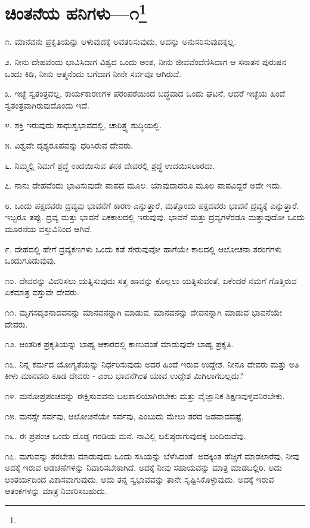 \newpage

\chapter[ಚಿಂತನೆಯ ಹನಿಗಳು—೧]{ಚಿಂತನೆಯ ಹನಿಗಳು—೧\protect\footnote{}}

೧. ಮಾನವನು ಪ್ರಕೃತಿಯನ್ನು ಆಳುವುದಕ್ಕೆ ಅವತರಿಸುವುದು, ಅದನ್ನು ಅನುಸರಿಸುವುದಕ್ಕಲ್ಲ.

೨. ನೀನು ದೇಹವೆಂದು ಭಾವಿಸಿದಾಗ ವಿಶ್ವದ ಒಂದು ಅಂಶ, ನೀನು ಜೀವವೆಂದೆಣಿಸಿದಾಗ ಆ ಸನಾತನ ಪುರುಷನ ಒಂದು ಕಿಡಿ, ನೀನು ಆತ್ಮನೆಂದು ಬಗೆದಾಗ ನೀನೇ ಸರ್ವವೂ ಆಗಿರುವೆ.

೩. ಇಚ್ಛೆ ಸ್ವತಂತ್ರವಲ್ಲ, ಕಾರ್ಯಕಾರಣಗಳ ಪರಂಪರೆಯಿಂದ ಬದ್ಧವಾದ ಒಂದು ಘಟನೆ. ಆದರೆ ಇಚ್ಛೆಯ ಹಿಂದೆ ಸ್ವತಂತ್ರವಾಗಿರುವುದೊಂದು ಇದೆ.

೪. ಶಕ್ತಿ ಇರುವುದು ಸಾಧುಸ್ವಭಾವದಲ್ಲಿ, ಚಾರಿತ್ರ್ಯ ಶುದ್ಧಿಯಲ್ಲಿ.

೫. ವಿಶ್ವವೇ ದೃಶ್ಯರೂಪವನ್ನು ಧರಿಸಿರುವ ದೇವರು.

೬. ನಿಮ್ಮಲ್ಲಿ ನಿಮಗೆ ಶ್ರದ್ಧೆ ಉದಯಿಸುವ ತನಕ ದೇವರಲ್ಲಿ ಶ್ರದ್ಧೆ ಉದಯಿಸಲಾರದು.

೭. ನಾನು ದೇಹವೆಂದು ಭಾವಿಸುವುದೇ ಪಾಪದ ಮೂಲ. ಯಾವುದಾದರೂ ಮೂಲ ಪಾಪವಿದ್ದರೆ ಅದೇ ಇದು.

೮. ಒಂದು ಪಕ್ಷದವರು ದ್ರವ್ಯವು  ಭಾವನೆಗೆ  ಕಾರಣ ಎನ್ನುತ್ತಾರೆ, ಮತ್ತೊಂದು ಪಕ್ಷದವರು ಭಾವನೆ ದ್ರವ್ಯಕ್ಕೆ ಎನ್ನುತ್ತಾರೆ. ಇಬ್ಬರೂ ತಪ್ಪು. ದ್ರವ್ಯ ಮತ್ತು ಭಾವನೆ ಏಕಕಾಲದಲ್ಲಿ ಇರುವುವು, ಭಾವನೆ ಮತ್ತು ದ್ರವ್ಯಗಳೆರಡೂ ಮತ್ತಾವುದೋ ಒಂದು ಮೂರನೆಯ ವಸ್ತುವಿನಿಂದ ಆಗಿವೆ.

೯. ದೇಹದಲ್ಲಿ ಹೇಗೆ ದ್ರವ್ಯಕಣಗಳು ಒಂದು ಕಡೆ ಸೇರುವುವೋ ಹಾಗೆಯೇ ಕಾಲದಲ್ಲಿ ಆಲೋಚನಾ ತರಂಗಗಳು ಒಂದುಗೂಡುವುವು.

೧೦. ದೇವರನ್ನು ವಿವರಿಸಲು ಯತ್ನಿಸುವುದು ಸತ್ತ ಹಾವನ್ನು ಕೊಲ್ಲಲು ಯತ್ನಿಸುವಂತೆ, ಏಕೆಂದರೆ ನಮಗೆ ಗೊತ್ತಿರುವ ಏಕಮಾತ್ರ ವಸ್ತುವೇ ದೇವರು.

೧೧. ಮೃಗಸದೃಶನಾದವನನ್ನು ಮಾನವನನ್ನಾಗಿ ಮಾಡುವ, ಮಾನವನನ್ನು ದೇವನನ್ನಾಗಿ ಮಾಡುವ ಭಾವನೆಯೇ ದೇವರು.

೧೨. ಆಂತರಿಕ ಪ್ರಕೃತಿಯನ್ನು ಬಾಹ್ಯ ಆಕಾರದಲ್ಲಿ ಕಾಣುವಂತೆ ಮಾಡುವುದೇ ಬಾಹ್ಯ ಪ್ರಕೃತಿ.

೧೩. ನಿನ್ನ ಕರ್ಮದ ಯೋಗ್ಯತೆಯನ್ನು ನಿರ್ಧರಿಸುವುದು ಅದರ ಹಿಂದೆ ಇರುವ ಉದ್ದೇಶ. ನೀನೂ ದೇವರು ಮತ್ತು ಅತಿ ಕೀಳು ಮಾನವನು ಕೂಡ ದೇವರು - ಎಂಬ ಭಾವನೆಗಿಂತ ಯಾವ ಉದ್ದೇಶ ಮಿಗಿಲಾಗಬಲ್ಲದು?

೧೪. ಮನೋಪ್ರಪಂಚವನ್ನು ಈಕ್ಷಿಸುವವನು ಬಲಶಾಲಿಯಾಗಿರಬೇಕು ಮತ್ತು ವೈಜ್ಞಾನಿಕ ಶಿಕ್ಷಣವುಳ್ಳವನಿರಬೇಕು.

೧೫. ಮನಸ್ಸೇ ಸರ್ವವು, ಆಲೋಚನೆಯೇ ಸರ್ವವು, ಎಂಬುದು ಮೇಲು ತರದ ಜಡವಾದವಷ್ಟೆ.

೧೬. ಈ ಪ್ರಪಂಚ ಒಂದು ದೊಡ್ಡ ಗರಡಿಯ ಮನೆ. ನಾವಿಲ್ಲಿ ಬಲಿಷ್ಠರಾಗುವುದಕ್ಕೆ ಬಂದಿರುವೆವು.

೧೭. ಮಗುವನ್ನು ತರಬೇತು ಮಾಡುವುದು ಒಂದು ಸಸಿಯನ್ನು ಬೆಳೆಸಿದಂತೆ. ಅದಕ್ಕಿಂತ ಹೆಚ್ಚಿಗೆ ಮಾಡಲಾರೆವು, ನೀವು ಅದಕ್ಕೆ ಇರುವ ಅಡಚಣೆಗಳನ್ನು ನಿವಾರಿಸಬೇಕಾಗಿದೆ. ಅದಕ್ಕೆ ನೀವು ಸಹಾಯವನ್ನು ಮಾತ್ರ ಮಾಡಬಲ್ಲಿರಿ. ಅದು ಆಂತರ್ಯದಿಂದ ವಿಕಾಸವಾಗುವುದು. ಅದು ತನ್ನ ಸ್ವಭಾವವನ್ನು ತಾನೇ ಸೃಷ್ಟಿಸಿಕೊಳ್ಳುವುದು. ಅದಕ್ಕೆ ಇರುವ ಆತಂಕಗಳನ್ನು ಮಾತ್ರ ನಿವಾರಿಸಬಹುದು.

